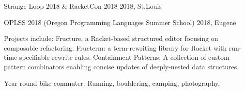 \documentclass[10pt,a4paper]{article}
\begin{document}
  \headedsubsection
    {Strange Loop 2018 \& RacketCon 2018}
    {2018, St.Louis}

  \headedsubsection
    {OPLSS 2018 (Oregon Programming Languages Summer School)}
    {2018, Eugene}
    {}


\spacedhrule{0.6em}{-0.4em}


\inlineheadsection
  {Projects include:}
  {Fructure, a Racket-based structured editor focusing on composable refactoring. Fructerm: a term-rewriting library for Racket with run-time specifiable rewrite-rules. Containment Patterns: A collection of custom pattern combinators enabling concise updates of deeply-nested data structures.}


\vspace{0.8em}

\spacedhrule{0.6em}{-0.4em}


\inlineheadsection
  {}{Year-round bike commuter. Running, bouldering, camping, photography.}
\end{document}
